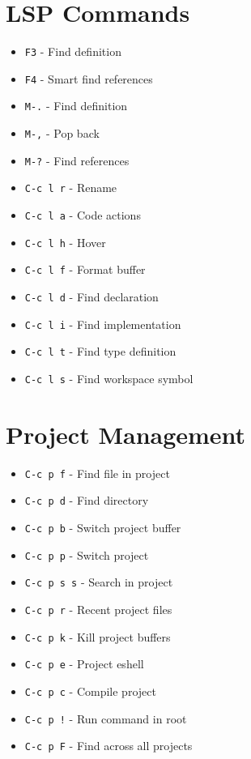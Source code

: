 \documentclass[6pt,landscape]{article}
\newcommand{\key}[1]{\texttt{#1}}
\begin{document}
\begin{multicols*}{5}
\section*{LSP Commands}
\begin{itemize}[leftmargin=*,itemsep=0pt,parsep=0pt,topsep=0pt]
\item \key{F3} - Find definition
\item \key{F4} - Smart find references
\item \key{M-.} - Find definition
\item \key{M-,} - Pop back
\item \key{M-?} - Find references
\item \key{C-c l r} - Rename
\item \key{C-c l a} - Code actions
\item \key{C-c l h} - Hover
\item \key{C-c l f} - Format buffer
\item \key{C-c l d} - Find declaration
\item \key{C-c l i} - Find implementation
\item \key{C-c l t} - Find type definition
\item \key{C-c l s} - Find workspace symbol
\end{itemize}

\section*{Project Management}
\begin{itemize}[leftmargin=*,itemsep=0pt,parsep=0pt,topsep=0pt]
\item \key{C-c p f} - Find file in project
\item \key{C-c p d} - Find directory
\item \key{C-c p b} - Switch project buffer
\item \key{C-c p p} - Switch project
\item \key{C-c p s s} - Search in project
\item \key{C-c p r} - Recent project files
\item \key{C-c p k} - Kill project buffers
\item \key{C-c p e} - Project eshell
\item \key{C-c p c} - Compile project
\item \key{C-c p !} - Run command in root
\item \key{C-c p F} - Find across all projects
\end{itemize}


\end{multicols*}
\end{document}
